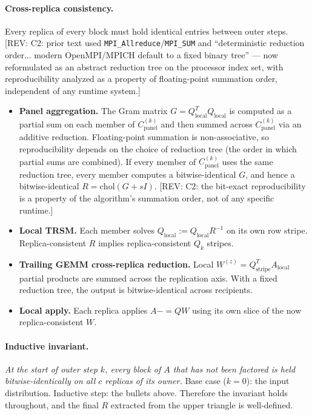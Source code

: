 \documentclass[11pt]{article}
\newcommand{\REV}[1]{\textcolor{blue!60!black}{\small\textsf{[REV: #1]}}}
\begin{document}
\paragraph{Cross-replica consistency.}
Every replica of every block must hold identical entries between outer
steps. \REV{C2: prior text used \texttt{MPI\_Allreduce}/\texttt{MPI\_SUM}
and ``deterministic reduction order... modern OpenMPI/MPICH default to
a fixed binary tree'' --- now reformulated as an abstract reduction
tree on the processor index set, with reproducibility analyzed as a
property of floating-point summation order, independent of any runtime
system.}

\begin{itemize}[leftmargin=2em]
  \item \textbf{Panel aggregation.} The Gram matrix
    $G = Q_{\mathrm{local}}^T Q_{\mathrm{local}}$ is computed as a
    partial sum on each member of $C^{(k)}_{\mathrm{panel}}$ and then
    summed across $C^{(k)}_{\mathrm{panel}}$ via an additive reduction.
    Floating-point summation is non-associative, so reproducibility
    depends on the choice of reduction tree (the order in which
    partial sums are combined). If every member of
    $C^{(k)}_{\mathrm{panel}}$ uses the same reduction tree, every
    member computes a bitwise-identical $G$, and hence a
    bitwise-identical $R = \mathrm{chol}(G + sI)$. \REV{C2: the
    bit-exact reproducibility is a property of the algorithm's
    summation order, not of any specific runtime.}
  \item \textbf{Local TRSM.} Each member solves
    $Q_{\mathrm{local}} := Q_{\mathrm{local}} R^{-1}$ on its own row
    stripe. Replica-consistent $R$ implies replica-consistent $Q_k$
    stripes.
  \item \textbf{Trailing GEMM cross-replica reduction.} Local
    $W^{(z)} = Q_{\mathrm{stripe}}^T A_{\mathrm{local}}$ partial
    products are summed across the replication axis. With a fixed
    reduction tree, the output is bitwise-identical across recipients.
  \item \textbf{Local apply.} Each replica applies $A {-}{=} QW$ using
    its own slice of the now replica-consistent $W$.
\end{itemize}

\paragraph{Inductive invariant.}
\emph{At the start of outer step $k$, every block of $A$ that has not
been factored is held bitwise-identically on all $c$ replicas of its
owner.} Base case ($k = 0$): the input distribution. Inductive step:
the bullets above. Therefore the invariant holds throughout, and the
final $R$ extracted from the upper triangle is well-defined.
\end{document}
